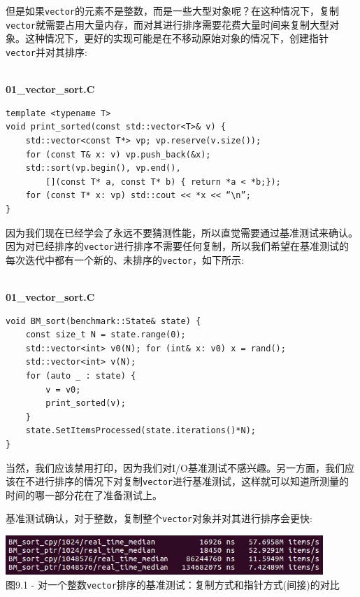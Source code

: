 但是如果\texttt{vector}的元素不是整数，而是一些大型对象呢？在这种情况下，复制\texttt{vector}就需要占用大量内存，而对其进行排序需要花费大量时间来复制大型对象。这种情况下，更好的实现可能是在不移动原始对象的情况下，创建指针\texttt{vector}并对其排序:

\hspace*{\fill} \\ %
\noindent
\textbf{01\_vector\_sort.C}
\begin{lstlisting}[style=styleCXX]
template <typename T>
void print_sorted(const std::vector<T>& v) {
	std::vector<const T*> vp; vp.reserve(v.size());
	for (const T& x: v) vp.push_back(&x);
	std::sort(vp.begin(), vp.end(), 
		[](const T* a, const T* b) { return *a < *b;});
	for (const T* x: vp) std::cout << *x << “\n”;
}
\end{lstlisting}

因为我们现在已经学会了永远不要猜测性能，所以直觉需要通过基准测试来确认。因为对已经排序的\texttt{vector}进行排序不需要任何复制，所以我们希望在基准测试的每次迭代中都有一个新的、未排序的\texttt{vector}，如下所示:

\hspace*{\fill} \\ %
\noindent
\textbf{01\_vector\_sort.C}
\begin{lstlisting}[style=styleCXX]
void BM_sort(benchmark::State& state) {
	const size_t N = state.range(0);
	std::vector<int> v0(N); for (int& x: v0) x = rand();
	std::vector<int> v(N);
	for (auto _ : state) {
		v = v0;
		print_sorted(v);
	}
	state.SetItemsProcessed(state.iterations()*N);
}
\end{lstlisting}

当然，我们应该禁用打印，因为我们对I/O基准测试不感兴趣。另一方面，我们应该在不进行排序的情况下对复制\texttt{vector}进行基准测试，这样就可以知道所测量的时间的哪一部分花在了准备测试上。

基准测试确认，对于整数，复制整个\texttt{vector}对象并对其进行排序会更快:

\begin{center}
\includegraphics[width=0.9\textwidth]{content/3/chapter9/images/1.jpg}\\
图9.1 - 对一个整数\texttt{vector}排序的基准测试：复制方式和指针方式(间接)的对比
\end{center}

